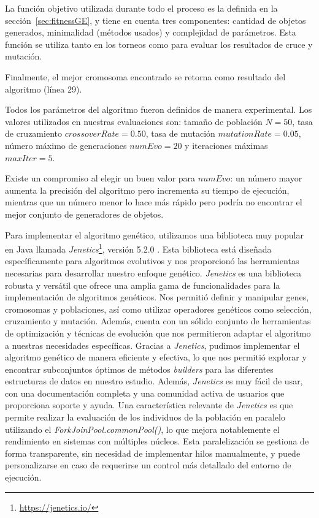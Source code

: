 La función objetivo utilizada durante todo el proceso es la definida en la sección~\ref{sec:fitnessGE}, y tiene en cuenta tres componentes: cantidad de objetos generados, minimalidad (métodos usados) y complejidad de parámetros. 
Esta función se utiliza tanto en los torneos como para evaluar los resultados de cruce y mutación.

Finalmente, el mejor cromosoma encontrado se retorna como resultado del algoritmo (línea 29).

Todos los parámetros del algoritmo fueron definidos de manera experimental.
Los valores utilizados en nuestras evaluaciones son: tamaño de población $N = 50$, tasa de cruzamiento $crossoverRate = 0.50$, tasa de mutación $mutationRate = 0.05$, número máximo de generaciones $numEvo = 20$ y iteraciones máximas $maxIter = 5$.
 
Existe un compromiso al elegir un buen valor para $numEvo$: un número mayor aumenta la precisión del algoritmo pero incrementa su tiempo de ejecución, 
mientras que un número menor lo hace más rápido pero podría no encontrar el
mejor conjunto de generadores de objetos.

Para implementar el algoritmo genético, utilizamos una biblioteca muy popular en Java llamada \emph{Jenetics}\footnote{\url{https://jenetics.io/}}, versión 5.2.0 . Esta biblioteca está diseñada específicamente para algoritmos evolutivos y nos proporcionó las herramientas necesarias para desarrollar nuestro enfoque genético.
\emph{Jenetics} es una biblioteca robusta y versátil que ofrece una amplia gama de funcionalidades para la implementación de algoritmos genéticos. Nos permitió definir y manipular genes, cromosomas y poblaciones, así como utilizar operadores genéticos como selección, cruzamiento y mutación. Además, cuenta con un sólido conjunto de herramientas de optimización y técnicas de evolución que nos permitieron adaptar el algoritmo a nuestras necesidades específicas.
Gracias a \emph{Jenetics}, pudimos implementar el algoritmo genético de manera eficiente y efectiva, lo que nos permitió explorar y encontrar subconjuntos óptimos de métodos \emph{builders} para las diferentes estructuras de datos en nuestro estudio. Además, \emph{Jenetics} es muy fácil de usar, con una documentación completa y una comunidad activa de usuarios que proporciona soporte y ayuda.
Una característica relevante de \emph{Jenetics} es que permite realizar la evaluación de los individuos de la población en paralelo utilizando el \emph{ForkJoinPool.commonPool()}, lo que mejora notablemente el rendimiento en sistemas con múltiples núcleos. Esta paralelización se gestiona de forma transparente, sin necesidad de implementar hilos manualmente, y puede personalizarse en caso de requerirse un control más detallado del entorno de ejecución.



